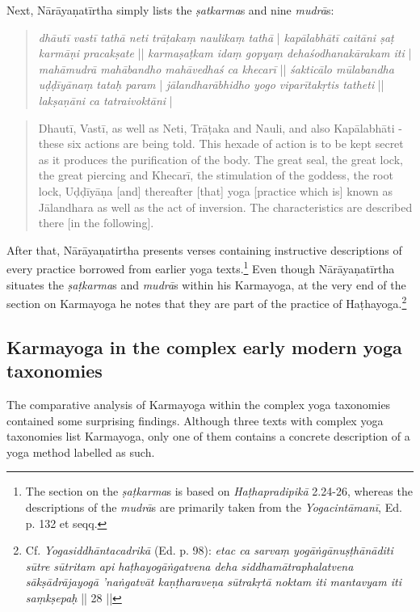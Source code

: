 Next, Nārāyaṇatīrtha simply lists the \textit{ṣatkarma}s and nine \textit{mudrā}s: 
\begin{quote}
\textit{dhāutī vastī tathā neti trāṭakaṃ naulikaṃ tathā} |
\textit{kapālabhātī caitāni ṣaṭ karmāṇi pracakṣate} ||
\textit{karmaṣaṭkam idaṃ gopyaṃ dehaśodhanakārakam iti} |
\textit{mahāmudrā mahābandho mahāvedhaś ca khecarī} ||
\textit{śakticālo mūlabandha uḍḍīyānaṃ tataḥ param} |
\textit{jālandharābhidho yogo viparītakṛtis tatheti} ||
\textit{lakṣaṇāni ca tatraivoktāni} |
\end{quote}
\begin{quote}
  Dhautī, Vastī, as well as Neti, Trāṭaka and Nauli,
  and also Kapālabhāti - these six actions are being told.
  This hexade of action is to be kept secret as it produces the purification of the body.
  The great seal, the great lock, the great piercing and Khecarī,
  the stimulation of the goddess, the root lock, Uḍḍīyāṇa [and] thereafter
  [that] yoga [practice which is] known as Jālandhara as well as the act of inversion.
  The characteristics are described there [in the following]. 
  \end{quote}

After that, Nārāyaṇatirtha presents verses containing instructive descriptions of every practice borrowed from earlier yoga texts.\footnote{The section on the \textit{ṣaṭkarma}s is based on \textit{Haṭhapradipikā} 2.24-26, whereas the descriptions of the \textit{mudrā}s are primarily taken from the \textit{Yogacintāmanī}, Ed. p. 132 et seqq.} Even though Nārāyaṇatīrtha situates the \textit{ṣaṭkarma}s and \textit{mudrā}s within his Karmayoga, at the very end of the section on Karmayoga he notes that they are part of the practice of Haṭhayoga.\footnote{Cf. \textit{Yogasiddhāntacadrikā} (Ed. p. 98): \textit{etac ca sarvaṃ yogāṅgānuṣṭhānāditi sūtre sūtritam api haṭhayogāṅgatvena deha siddhamātraphalatvena sākṣādrājayogā 'naṅgatvāt kaṇṭharaveṇa sūtrakṛtā noktam iti mantavyam iti saṃkṣepaḥ} || 28 ||}

\subsection{Karmayoga in the complex early modern yoga taxonomies}

The comparative analysis of Karmayoga within the complex yoga taxonomies contained some surprising findings. Although three texts with complex yoga taxonomies list Karmayoga, only one of them contains a concrete description of a yoga method labelled as such.

